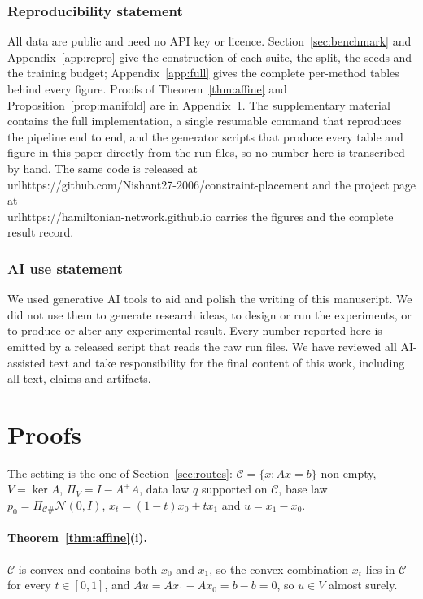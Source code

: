 \documentclass{article}
\begin{document}
\subsubsection*{Reproducibility statement}
All data are public and need no API key or licence. Section~\ref{sec:benchmark}
and Appendix~\ref{app:repro} give the construction of each suite, the split, the seeds
and the training budget; Appendix~\ref{app:full} gives the complete per-method tables
behind every figure. Proofs of Theorem~\ref{thm:affine} and
Proposition~\ref{prop:manifold} are in Appendix~\ref{app:proofs}. The supplementary
material contains the full implementation, a single resumable command that reproduces
the pipeline end to end, and the generator scripts that produce every table and figure
in this paper directly from the run files, so no number here is transcribed by hand. The
same code is released at \\url{https://github.com/Nishant27-2006/constraint-placement}
and the project page at \\url{https://hamiltonian-network.github.io} carries the
figures and the complete result record.

\subsubsection*{AI use statement}
We used generative AI tools to aid and polish the writing of this manuscript.
We did not use them to generate research ideas, to design or run the experiments, or to
produce or alter any experimental result. Every number reported here is emitted by a
released script that reads the raw run files. We have reviewed all AI-assisted text and
take responsibility for the final content of this work, including all text, claims and
artifacts.




\appendix
\section{Proofs}\label{app:proofs}
The setting is the one of Section~\ref{sec:routes}: $\mathcal C=\{x:Ax=b\}$
non-empty, $V=\ker A$, $\Pi_V=I-A^{+}A$, data law $q$ supported on $\mathcal C$, base
law $p_0=\Pi_{\mathcal C\#}\mathcal N(0,I)$, $x_t=(1-t)x_0+tx_1$ and $u=x_1-x_0$.

\paragraph{Theorem~\ref{thm:affine}(i).} $\mathcal C$ is convex and contains
both $x_0$ and $x_1$, so the convex combination $x_t$ lies in $\mathcal C$ for every
$t\in[0,1]$, and $Au=Ax_1-Ax_0=b-b=0$, so $u\in V$ almost surely.
\end{document}
